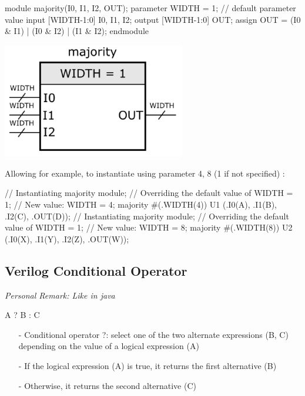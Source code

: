 \documentclass[12pt,openany]{book}
\begin{document}
\begin{minipage}[htp]{0.45\textwidth}
	\begin{vhdl}
module majority(I0, I1, I2, OUT);
	parameter WIDTH = 1; // default parameter value
	input [WIDTH-1:0] I0, I1, I2;
	output [WIDTH-1:0] OUT;
	assign OUT = (I0 & I1) | (I0 & I2) | (I1 & I2);
endmodule
	\end{vhdl}
\end{minipage}
\hfill
\hspace*{20px}
\vline
\hspace*{20px}
\hfill
\begin{minipage}[htp]{0.55\textwidth}
\includegraphics[width=0.6\textwidth]{circuits/16.3.3.png}
\end{minipage}

Allowing for example, to instantiate using parameter 4, 8 (1 if not specified) :
\begin{vhdl}
// Instantiating majority module;
// Overriding the default value of WIDTH = 1;
// New value: WIDTH = 4;
majority #(.WIDTH(4)) U1 (.I0(A), .I1(B), .I2(C), .OUT(D));
// Instantiating majority module;
// Overriding the default value of WIDTH = 1;
// New value: WIDTH = 8;
majority #(.WIDTH(8)) U2 (.I0(X), .I1(Y), .I2(Z), .OUT(W));
\end{vhdl}

\subsection{Verilog Conditional Operator}
\textit{Personal Remark: Like in java}
\begin{vhdl}
A ? B : C
\end{vhdl}
\begin{itemize}
\item[-] Conditional operator ?: select one of the two alternate expressions (B, C) depending on the value of a logical expression (A)
\item[-] If the logical expression (A) is true, it returns the first alternative (B)
\item[-] Otherwise, it returns the second alternative (C)
\end{itemize}
\end{document}
